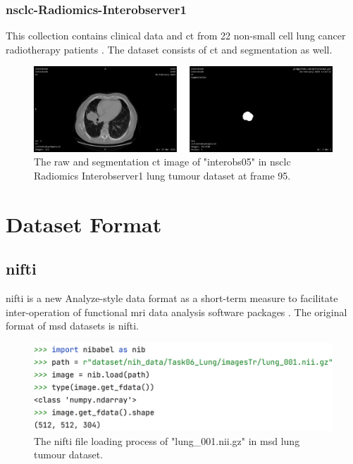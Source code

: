 \documentclass[11pt,times,oneside,openright]{eeereport}
\begin{document}
\subsubsection{\acrshort{nsclc}-Radiomics-Interobserver1}

This collection contains clinical data and \acrshort{ct} from 22 non-small cell lung cancer radiotherapy patients \cite{wee2019data}. The dataset consists of \acrshort{ct} and segmentation as well.


\begin{figure}[h]
    \centering
    \includegraphics[width=\textwidth]{fig/nsclc_example_dicom.png}
    \caption{The raw and segmentation \acrshort{ct} image of "interobs05" in \acrshort{nsclc} Radiomics Interobserver1 lung tumour dataset at frame 95.}
    \label{fig:nsclc_example_dicom}
\end{figure}

\section{Dataset Format}

\subsection{\acrlong{nifti}}

\acrfull{nifti} is a new Analyze-style data format as a short-term measure to facilitate inter-operation of functional \acrshort{mri} data analysis software packages \cite{jonnalagadda2009nifti}. The original format of \acrshort{msd} datasets is \acrshort{nifti}.

\begin{figure}[h]
    \centering
    \includegraphics[width=\textwidth]{fig/nii_import.png}
    \caption{The \acrshort{nifti} file loading process of "lung\_001.nii.gz" in \acrshort{msd} lung tumour dataset.}
    \label{fig:nii_import}
\end{figure}
\end{document}
